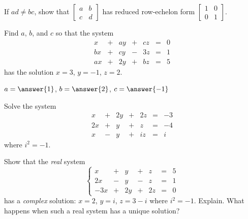 \documentclass{ximera}
\begin{document}
\begin{problem}\label{prb:rref_nonsingular}
If $ad \neq bc$, show that $\begin{bmatrix}
a & b \\
c & d
\end{bmatrix}$ has reduced row-echelon form $\begin{bmatrix}
 1 & 0 \\
 0 & 1
 \end{bmatrix}$.
\end{problem}

\begin{problem}\label{prb:coeffs}
Find $a$, $b$, and $c$ so that the system
\begin{equation*}
\begin{array}{rlrlrcr}
	 x & + &  ay & + &  cz & = &  0 \\
	bx & + &  cy & - &  3z & = &  1 \\
	ax & + &  2y & + &  bz & = &  5
\end{array}
\end{equation*}
has the solution $x = 3$, $y = -1$, $z = 2$.

$a = \answer{1}$, $b = \answer{2}$, $c = \answer{-1}$

\end{problem}

\begin{problem}\label{prb:complex}
Solve the system
$$
\begin{array}{rlrlrcr}
	 x & + &  2y & + &  2z & = & -3 \\
	2x & + &   y & + &   z & = & -4 \\
	 x & - &   y & + &  iz & = &  i
\end{array}
$$
where $i^{2} = -1$. 
\end{problem}

\begin{problem}\label{prb:real_complex}
Show that the \textit{real} system
\begin{equation*}
\left \{
\begin{array}{rlrlrcr}
	 x & + &   y & + &   z & = &  5 \\
	2x & - &   y & - &   z & = &  1 \\
	-3x& + &  2y & + &  2z & = &  0
\end{array}
\right.
\end{equation*}
has a \textit{complex} solution: $x = 2$, $y = i$, $z = 3 - i$ where $i^{2} = -1$. Explain. What happens when such a real system has a unique solution?


\end{problem}
\end{document}
